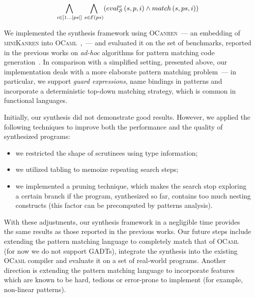  \[
 \bigwedge_{i\in[1\dots|ps|]}\,\bigwedge_{s\in\mathcal{E}(ps)} (eval^o_{\mathcal{S}}\, (s, p, i) \wedge match\, (s, ps, i))
 \]
 
 We implemented the synthesis framework using \textsc{OCanren}~--- an embedding of \textsc{miniKanren} into \textsc{OCaml}~\cite{ocanren},~---
 and evaluated it on the set of benchmarks, reported in the previous works on \emph{ad-hoc} algorithms for pattern matching
 code generation~\cite{maranget2001,maranget2008}. In comparison with a simplified setting, presented above, our implementation
 deals with a more elaborate pattern matching problem~--- in particular, we support \emph{guard expressions}, name bindings in
 patterns and incorporate a deterministic top-down matching strategy, which is common in functional languages.
 
 Initially, our synthesis did not demonstrate good results. However, we applied the following techniques to improve both the performance
 and the quality of synthesized programs:
 
 \begin{itemize}
 \item we restricted the shape of scrutinees using type information;
 \item we utilized tabling to memoize repeating search steps;
 \item we implemented a pruning technique, which makes the search stop exploring a certain branch if the program, synthesized so far,
   contains too much nesting constructs (this factor can be precomputed by patterns analysis).
 \end{itemize}
 
 With these adjustments, our synthesis framework in a negligible time provides the same results as those reported in the previous works.
 Our future steps include extending the pattern matching language to completely match that of \textsc{OCaml} (for
 now we do not support GADTs), integrate the synthesis into the existing \textsc{OCaml} compiler and evaluate it on a
 set of real-world programs. Another direction is extending the pattern matching language to incorporate features which
 are known to be hard, tedious or error-prone to implement (for example, non-linear patterns).
 
